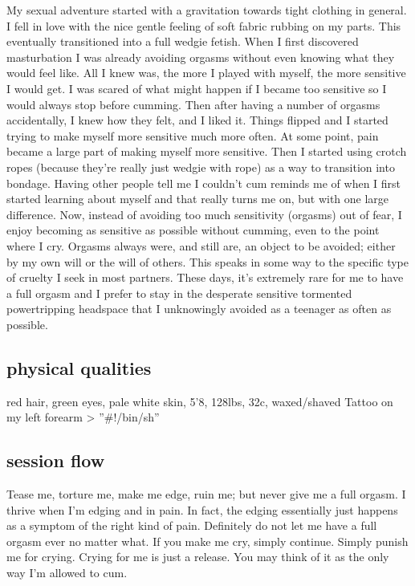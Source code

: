 \documentclass{article}
\begin{document}
My sexual adventure started with a gravitation towards tight clothing in general.
I fell in love with the nice gentle feeling of soft fabric rubbing on my parts.
This eventually transitioned into a full wedgie fetish.
When I first discovered masturbation I was already avoiding orgasms without even knowing what they would feel like.
All I knew was, the more I played with myself, the more sensitive I would get.
I was scared of what might happen if I became too sensitive so I would always stop before cumming.
Then after having a number of orgasms accidentally, I knew how they felt, and I liked it.
Things flipped and I started trying to make myself more sensitive much more often.
At some point, pain became a large part of making myself more sensitive.
Then I started using crotch ropes (because they're really just wedgie with rope) as a way to transition into bondage.
Having other people tell me I couldn't cum reminds me of when I first started learning about myself and that really turns me on, but with one large difference.
Now, instead of avoiding too much sensitivity (orgasms) out of fear, I enjoy becoming as sensitive as possible without cumming, even to the point where I cry.
Orgasms always were, and still are, an object to be avoided; either by my own will or the will of others.
This speaks in some way to the specific type of cruelty I seek in most partners.
These days, it's extremely rare for me to have a full orgasm and I prefer to stay in the desperate sensitive tormented powertripping headspace that I unknowingly avoided as a teenager as often as possible.

\subsection{physical qualities}

red hair, green eyes, pale white skin, 5'8, 128lbs, 32c, waxed/shaved
Tattoo on my left forearm \textgreater{} ''#!/bin/sh''

\subsection{session flow}

Tease me, torture me, make me edge, ruin me; but never give me a full orgasm.
I thrive when I'm edging and in pain.
In fact, the edging essentially just happens as a symptom of the right kind of pain.
Definitely do not let me have a full orgasm ever no matter what.
If you make me cry, simply continue. Simply punish me for crying.
Crying for me is just a release. You may think of it as the only way I'm allowed to cum.
\end{document}
